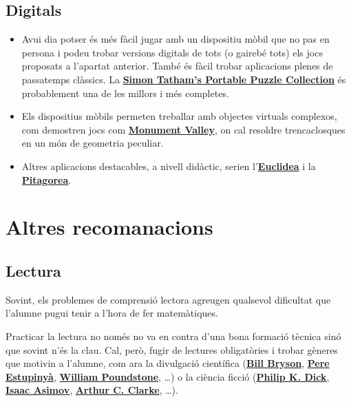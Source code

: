\documentclass[a4paper, 12pt]{article}
\begin{document}
        \subsection*{Digitals}

            \begin{itemize}
                \item Avui dia potser és més fàcil jugar amb un dispositiu mòbil que no pas en persona i podeu trobar versions digitals de tots (o gairebé tots) els jocs proposats a l'apartat anterior. També és fàcil trobar aplicacions plenes de passatemps clàssics. La \href{https://play.google.com/store/apps/details?id=name.boyle.chris.sgtpuzzles}{\textbf{Simon Tatham's Portable Puzzle Collection}} és probablement una de les millors i més completes.
                \item Els dispositius mòbils permeten treballar amb objectes virtuals complexos, com demostren jocs com \href{https://play.google.com/store/apps/details?id=com.ustwo.monumentvalley}{\textbf{Monument Valley}}, on cal resoldre trencaclosques en un món de geometria peculiar.
                \item Altres aplicacions destacables, a nivell didàctic, serien l'\href{https://play.google.com/store/apps/details?id=com.hil_hk.euclidea}{\textbf{Euclidea}} i la \href{https://play.google.com/store/apps/details?id=com.hil_hk.pythagorea}{\textbf{Pitagorea}}.
            \end{itemize}

    \newpage %
    
    \section*{Altres recomanacions}

        \subsection*{Lectura}

            Sovint, els problemes de comprensió lectora agreugen qualsevol dificultat que l'alumne pugui tenir a l'hora de fer matemàtiques.

            Practicar la lectura no només no va en contra d'una bona formació tècnica sinó que sovint n'és la clau. Cal, però, fugir de lectures obligatòries i trobar gèneres que motivin a l'alumne, com ara la divulgació científica (\href{https://ca.wikipedia.org/wiki/Bill_Bryson}{\textbf{Bill Bryson}}, \href{https://ca.wikipedia.org/wiki/Pere_Estupiny\%C3\%A0}{\textbf{Pere Estupinyà}}, \href{https://en.wikipedia.org/wiki/William_Poundstone}{\textbf{William Poundstone}}, \dots) o la ciència ficció (\href{https://ca.wikipedia.org/wiki/Philip_K._Dick}{\textbf{Philip K. Dick}}, \href{https://ca.wikipedia.org/wiki/Isaac_Asimov}{\textbf{Isaac Asimov}}, \href{https://ca.wikipedia.org/wiki/Arthur_C._Clarke}{\textbf{Arthur C. Clarke}}, \dots).
\end{document}
